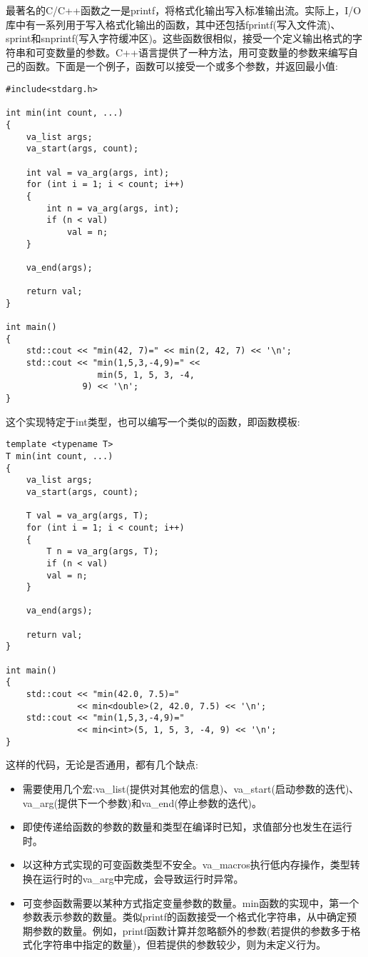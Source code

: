 最著名的C/C++函数之一是printf，将格式化输出写入标准输出流。实际上，I/O库中有一系列用于写入格式化输出的函数，其中还包括fprintf(写入文件流)、sprint和snprintf(写入字符缓冲区)。这些函数很相似，接受一个定义输出格式的字符串和可变数量的参数。C++语言提供了一种方法，用可变数量的参数来编写自己的函数。下面是一个例子，函数可以接受一个或多个参数，并返回最小值:

\begin{lstlisting}[style=styleCXX]
#include<stdarg.h>

int min(int count, ...)
{
	va_list args;
	va_start(args, count);
	
	int val = va_arg(args, int);
	for (int i = 1; i < count; i++)
	{
		int n = va_arg(args, int);
		if (n < val)
			val = n;
	}

	va_end(args);
	
	return val;
}

int main()
{
	std::cout << "min(42, 7)=" << min(2, 42, 7) << '\n';
	std::cout << "min(1,5,3,-4,9)=" <<
				  min(5, 1, 5, 3, -4,
	           9) << '\n';
}
\end{lstlisting}

这个实现特定于int类型，也可以编写一个类似的函数，即函数模板:

\begin{lstlisting}[style=styleCXX]
template <typename T>
T min(int count, ...)
{
	va_list args;
	va_start(args, count);
	
	T val = va_arg(args, T);
	for (int i = 1; i < count; i++)
	{
		T n = va_arg(args, T);
		if (n < val)
		val = n;
	}

	va_end(args);
	
	return val;
}

int main()
{
	std::cout << "min(42.0, 7.5)="
		      << min<double>(2, 42.0, 7.5) << '\n';
	std::cout << "min(1,5,3,-4,9)="
  	          << min<int>(5, 1, 5, 3, -4, 9) << '\n';
}
\end{lstlisting}

这样的代码，无论是否通用，都有几个缺点:

\begin{itemize}
\item
需要使用几个宏:va\_list(提供对其他宏的信息)、va\_start(启动参数的迭代)、va\_arg(提供下一个参数)和va\_end(停止参数的迭代)。

\item
即使传递给函数的参数的数量和类型在编译时已知，求值部分也发生在运行时。

\item
以这种方式实现的可变函数类型不安全。va\_macros执行低内存操作，类型转换在运行时的va\_arg中完成，会导致运行时异常。

\item
可变参函数需要以某种方式指定变量参数的数量。min函数的实现中，第一个参数表示参数的数量。类似printf的函数接受一个格式化字符串，从中确定预期参数的数量。例如，printf函数计算并忽略额外的参数(若提供的参数多于格式化字符串中指定的数量)，但若提供的参数较少，则为未定义行为。
\end{itemize}

